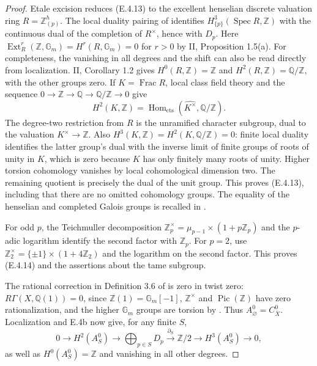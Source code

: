\begin{proof}
Etale excision reduces (E.4.13) to the excellent henselian discrete
valuation ring $R=\mathbb Z_{(p)}^h$. The local duality pairing
of \citet[II, Theorem 1.8, with its pairing defined on p.~152]{D_MilneADT2006}
identifies $H^3_{\{p\}}(\operatorname{Spec}R,\mathbb Z)$ with the
continuous dual of the completion of $R^\times$, hence with $D_p$.
Here $\operatorname{Ext}^r_R(\mathbb Z,\mathbb G_m)
=H^r(R,\mathbb G_m)=0$ for $r>0$ by II, Proposition 1.5(a).
For completeness, the vanishing in all degrees and the shift can also
be read directly from localization. II, Corollary 1.2 gives
$H^0(R,\mathbb Z)=\mathbb Z$ and $H^2(R,\mathbb Z)=\mathbb Q/\mathbb Z$,
with the other groups zero. If $K=\operatorname{Frac}R$, local class
field theory and the sequence
$0\to\mathbb Z\to\mathbb Q\to\mathbb Q/\mathbb Z\to0$ give
\[
 H^2(K,\mathbb Z)
   =\operatorname{Hom}_{\mathrm{cts}}(\widehat{K^\times},
                                      \mathbb Q/\mathbb Z).
\]
The degree-two restriction from $R$ is the unramified character
subgroup, dual to the valuation $K^\times\to\mathbb Z$.
Also $H^3(K,\mathbb Z)=H^2(K,\mathbb Q/\mathbb Z)=0$:
finite local duality identifies the latter group's dual with the
inverse limit of finite groups of roots of unity in $K$, which is
zero because $K$ has only finitely many roots of unity.
Higher torsion cohomology vanishes by local cohomological dimension
two. The remaining quotient is precisely the dual of the unit
group. This proves (E.4.13), including that there are no omitted
cohomology groups. The equality of the henselian and completed
Galois groups is recalled in
\citet[I, proof of Theorem 2.14, pp.~36--37]{D_MilneADT2006}.

For odd $p$, the Teichmuller decomposition
$\mathbb Z_p^\times=\mu_{p-1}\times(1+p\mathbb Z_p)$ and the
$p$-adic logarithm identify the second factor with $\mathbb Z_p$.
For $p=2$, use
$\mathbb Z_2^\times=\{\pm1\}\times(1+4\mathbb Z_2)$ and the
logarithm on the second factor. This proves (E.4.14) and the
assertions about the tame subgroup.

The rational correction in Definition 3.6 of
\citet{D_FlachMorin2018} is zero in twist zero:
$R\Gamma(X,\mathbb Q(1))=0$, since $\mathbb Z(1)=\mathbb G_m[-1]$,
$\mathbb Z^\times$ and $\operatorname{Pic}(\mathbb Z)$ have zero
rationalization, and the higher $\mathbb G_m$ groups are torsion
by \citet[II, Proposition 2.1]{D_MilneADT2006}.
Thus $A_\varnothing^0=C_{\overline X}^0$.
Localization and E.4b now give, for any finite $S$,
\[
 0\longrightarrow H^2(A_S^0)\longrightarrow
       \bigoplus_{p\in S}D_p
   \xrightarrow{\partial_S}\mathbb Z/2
   \longrightarrow H^3(A_S^0)\longrightarrow0,
 \tag{E.4.17}
\]
as well as $H^0(A_S^0)=\mathbb Z$ and vanishing in all other degrees.


\end{proof}

